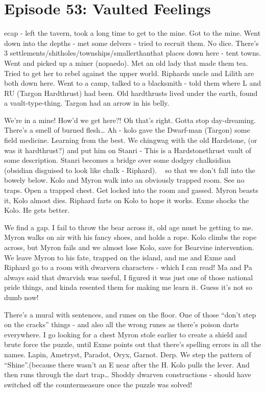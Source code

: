 \section{Episode 53: Vaulted Feelings}

\begin{multicols}{2}

ecap - left the tavern, took a long time to get to the mine. Got to the mine. Went down into the depths - met some delvers - tried to recruit them. No dice. There’s 3 settlements/shitholes/townships/smallerthanthat places down here - tent towns. Went and picked up a miner (nopaedo). Met an old lady that made them tea. Tried to get her to rebel against the upper world. Riphards uncle and Lilith are both down here. Went to a camp, talked to a blacksmith - told them where L and RU (Targon Hardthrust) had been. Old hardthrusts lived under the earth, found a vault-type-thing. Targon had an arrow in his belly.\medskip

We’re in a mine! How’d we get here?! Oh that’s right. Gotta stop day-dreaming. There’s a smell of burned flesh… Ah - kolo gave the Dwarf-man (Targon) some field medicine. Learning from the best. We chingwag with the old Hardstone, (or was it hardthrust?) and put him on Stanri - This is a Hardstonethrust vault of some description. Stanri becomes a bridge over some dodgey chalksidian (obsidian disguised to look like chalk - Riphard). ~ so that we don’t fall into the bowely below. Kolo and Myron walk into an obviously trapped room. See no traps. Open a trapped chest. Get locked into the room and gassed. Myron beasts it, Kolo almost dies. Riphard farts on Kolo to hope it works. Exme shocks the Kolo. He gets better.\medskip

We find a gap. I fail to throw the bear across it, old age must be getting to me. Myron walks on air with his fancy shoes, and holds a rope. Kolo climbs the rope across, but Myron fails and we almost lose Kolo, save for Bearvine intervention. We leave Myron to his fate, trapped on the island, and me and Exme and Riphard go to a room with dwarvern characters - which I can read! Ma and Pa always said that dwarvish was useful, I figured it was just one of those national pride things, and kinda resented them for making me learn it. Guess it’s not so dumb now!\medskip

There’s a mural with sentences, and runes on the floor. One of those “don’t step on the cracks” things - and also all the wrong runes as there’s poison darts everywhere. I go looking for a chest Myron stole earlier to create a shield and brute force the puzzle, until Exme points out that there’s spelling errors in all the names. Lapin, Ametryst, Paradot, Oryx, Garnot. Derp. We step the pattern of “Shine”.(because there wasn’t an E near after the H. Kolo pulls the lever. And then runs through the dart trap… Shoddy dwarven constructions - should have switched off the countermeasure once the puzzle was solved!\medskip


\end{multicols}
